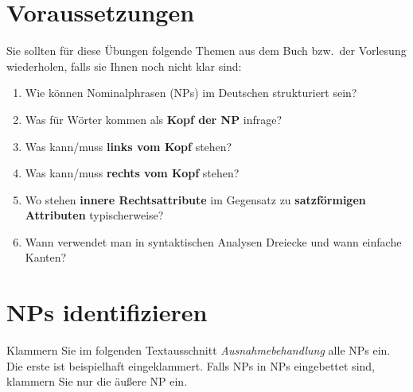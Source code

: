 \section*{Voraussetzungen}

Sie sollten für diese Übungen folgende Themen aus dem Buch bzw.\ der Vorlesung wiederholen, falls sie Ihnen noch nicht klar sind:

\begin{enumerate}\Lf
  \item Wie können Nominalphrasen (NPs) im Deutschen strukturiert sein? 
  \item Was für Wörter kommen als \textbf{Kopf der NP} infrage?
  \item Was kann\slash muss \textbf{links vom Kopf} stehen?
  \item Was kann\slash muss \textbf{rechts vom Kopf} stehen?
  \item Wo stehen \textbf{innere Rechtsattribute} im Gegensatz zu \textbf{satzförmigen Attributen} typischerweise?
  \item Wann verwendet man in syntaktischen Analysen Dreiecke und wann einfache Kanten?
\end{enumerate}

\section{NPs identifizieren}\label{sec:erkennen}

Klammern Sie im folgenden Textausschnitt \textit{Ausnahmebehandlung} alle NPs ein.
Die erste ist beispielhaft eingeklammert.
Falls NPs in NPs eingebettet sind, klammern Sie nur die äußere NP ein.

